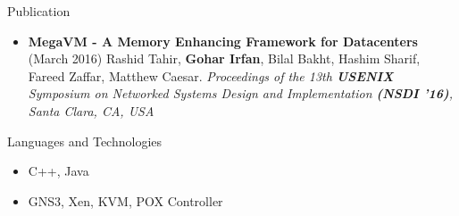 \documentclass[]{Gohar_CV_Jobs}
\begin{document}
    \begin{cvsection}{Publication}
        \begin{cvsubsection}{}{}{}  
            \begin{itemize}
                \item \textbf{MegaVM - A Memory Enhancing Framework for Datacenters} (March 2016) Rashid Tahir, \textbf{Gohar Irfan}, Bilal Bakht, Hashim Sharif, Fareed Zaffar, Matthew Caesar. \textit{Proceedings of the 13th \textbf{USENIX} Symposium on Networked Systems Design and Implementation \textbf{(NSDI ’16)}, Santa Clara, CA, USA}
            \end{itemize}
        \end{cvsubsection}
    \end{cvsection}
    
    \begin{cvsection}{Languages and Technologies}
        \begin{cvsubsection}{}{}{}  
            \begin{itemize}
                \item C++, Java
                \item GNS3, Xen, KVM, POX Controller
            \end{itemize}
        \end{cvsubsection}
    \end{cvsection}
    
\end{document}
